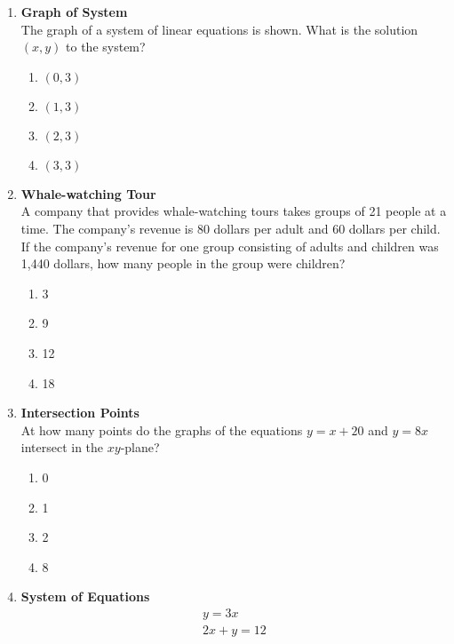 \begin{enumerate}
\newpage

\item \textbf{Graph of System}\\
The graph of a system of linear equations is shown. What is the solution $(x, y)$ to the system?
\begin{enumerate}[label=(\Alph*)]
  \item $(0,3)$
  \item $(1,3)$
  \item $(2,3)$
  \item $(3,3)$
\end{enumerate}
\begin{subanswer}
\end{subanswer}

\item \textbf{Whale-watching Tour}\\
A company that provides whale-watching tours takes groups of 21 people at a time. The company's revenue is 80 dollars per adult and 60 dollars per child. If the company's revenue for one group consisting of adults and children was 1,440 dollars, how many people in the group were children?
\begin{enumerate}[label=(\Alph*)]
  \item 3
  \item 9
  \item 12
  \item 18
\end{enumerate}
\begin{subanswer}
\end{subanswer}

\newpage

\item \textbf{Intersection Points}\\
At how many points do the graphs of the equations $y = x + 20$ and $y = 8x$ intersect in the $xy$-plane?
\begin{enumerate}[label=(\Alph*)]
  \item 0
  \item 1
  \item 2
  \item 8
\end{enumerate}
\begin{subanswer}
\end{subanswer}

\item \textbf{System of Equations}\\
$$
\begin{gathered}
y = 3x \\
2x + y = 12
\end{gathered}
$$


\end{enumerate}
